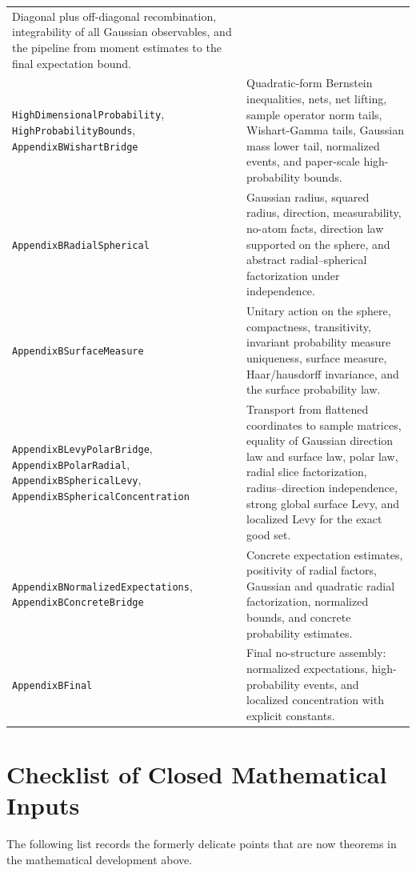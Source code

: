 \documentclass[11pt,oneside]{book}
\newcommand{\1}{\mathbf 1}
\newcommand{\leanfile}[1]{\begingroup\scriptsize\texttt{#1}\endgroup}
\begin{document}
\begin{longtable}{>{\raggedright\arraybackslash}p{}
                  >{\raggedright\arraybackslash}p{}}
Diagonal plus off-diagonal recombination, integrability of all Gaussian
observables, and the pipeline from moment estimates to the final expectation
bound.\\
\leanfile{HighDimensionalProbability},
\leanfile{HighProbabilityBounds},
\leanfile{AppendixBWishartBridge} &
Quadratic-form Bernstein inequalities, nets, net lifting, sample operator
norm tails, Wishart-Gamma tails, Gaussian mass lower tail, normalized events,
and paper-scale high-probability bounds.\\
\leanfile{AppendixBRadialSpherical} &
Gaussian radius, squared radius, direction, measurability, no-atom facts,
direction law supported on the sphere, and abstract radial--spherical
factorization under independence.\\
\leanfile{AppendixBSurfaceMeasure} &
Unitary action on the sphere, compactness, transitivity, invariant probability
measure uniqueness, surface measure, Haar/hausdorff invariance, and the
surface probability law.\\
\leanfile{AppendixBLevyPolarBridge},
\leanfile{AppendixBPolarRadial},
\leanfile{AppendixBSphericalLevy},
\leanfile{AppendixBSphericalConcentration} &
Transport from flattened coordinates to sample matrices, equality of Gaussian
direction law and surface law, polar law, radial slice factorization,
radius--direction independence, strong global surface Levy, and localized
Levy for the exact good set.\\
\leanfile{AppendixBNormalizedExpectations},
\leanfile{AppendixBConcreteBridge} &
Concrete expectation estimates, positivity of radial factors, Gaussian and
quadratic radial factorization, normalized bounds, and concrete probability
estimates.\\
\leanfile{AppendixBFinal} &
Final no-structure assembly: normalized expectations, high-probability
events, and localized concentration with explicit constants.\\
\bottomrule
\end{longtable}

\chapter{Checklist of Closed Mathematical Inputs}

The following list records the formerly delicate points that are now theorems
in the mathematical development above.
\end{document}
